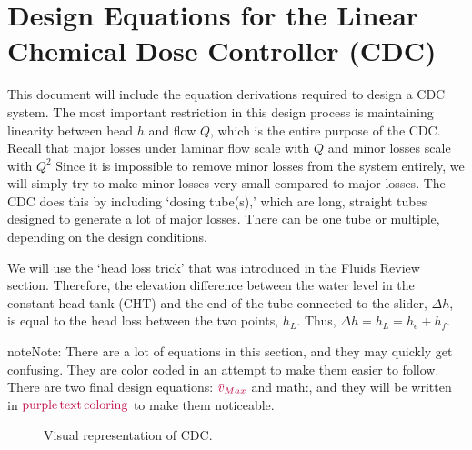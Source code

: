 \documentclass[letterpaper,10pt,english]{sphinxmanual}
\let\sphinxpxdimen\pdfpxdimen\else\newdimen\sphinxpxdimen
\begin{document}
\section{Design Equations for the Linear Chemical Dose Controller (CDC)}
\label{\detokenize{Flow_Control_and_Measurement/FCM_Derivations:design-equations-for-the-linear-chemical-dose-controller-cdc}}\label{\detokenize{Flow_Control_and_Measurement/FCM_Derivations:heading-design-equations-for-the-cdc}}
This document will include the equation derivations required to design a CDC system. The most important restriction in this design process is maintaining linearity between head \(h\) and flow \(Q\), which is the entire purpose of the CDC. Recall that major losses under laminar flow scale with \(Q\) and minor losses scale with \(Q^2\) Since it is impossible to remove minor losses from the system entirely, we will simply try to make minor losses very small compared to major losses. The CDC does this by including ‘dosing tube(s),’ which are long, straight tubes designed to generate a lot of major losses. There can be one tube or multiple, depending on the design conditions.

We will use the ‘head loss trick’ that was introduced in the Fluids Review section. Therefore, the elevation difference between the water level in the constant head tank (CHT) and the end of the tube connected to the slider, \(\Delta h\), is equal to the head loss between the two points, \(h_L\). Thus, \(\Delta h = h_L = h_e + h_f\).

\begin{sphinxadmonition}{note}{Note:}
There are a lot of equations in this section, and they may quickly get confusing. They are color coded in an attempt to make them easier to follow. There are two final design equations: \(\color{purple}{\bar v_{Max}}\) and math:, and they will be written in \(\color{purple}{\rm{purple \, text \, coloring}}\) to make them noticeable.
\end{sphinxadmonition}

\begin{figure}[htbp]
\centering
\capstart

\noindent\sphinxincludegraphics[width=600\sphinxpxdimen]{{CDC_derivation}.png}
\caption{Visual representation of CDC.}\label{\detokenize{Flow_Control_and_Measurement/FCM_Derivations:id5}}\label{\detokenize{Flow_Control_and_Measurement/FCM_Derivations:figure-cdc-derivation}}\end{figure}
\end{document}
